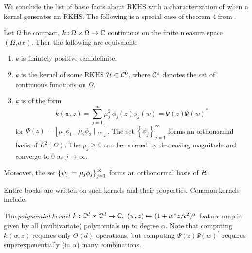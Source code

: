 We conclude the list of basic facts about RKHS with a characterization of 
when a kernel generates an RKHS. The following is a special case of theorem 
$4$ from \cite{RKHS_probability}. 

\begin{theorem}
    \label{thm:RKHS}
    Let $\Omega$ be compact, $k : \Omega \times \Omega \to \mathbb{C}$ continuous on the 
    finite measure space $(\Omega, dx)$. Then the following are equivalent: 
    \begin{enumerate}
        \item $k$ is finintely positive semidefinite. 
        \item $k$ is the kernel of some RKHS $\mathcal{H} \subset \mathcal{C}^0$, where $\mathcal{C}^0$ 
            denotes the set of continuous functions on $\Omega$. 
        \item $k$ is of the form 
            \begin{equation}
                k(w, z) 
                = \sum_{j=1}^{\infty} \mu_j^2\, \phi_j (z) \overline{\phi_j (w)}
                = \Psi (z) \Psi (w)^*
            \end{equation}
            for $\Psi (z) = \left[ \mu_1 \phi_1 \mid \mu_2 \phi_2 \mid \ldots \right]$. 
            The set $\left\{ \phi_j \right\}_{j=1}^\infty$ forms an orthonormal 
            basis of $L^2 (\Omega)$. 
            The $\mu_j \geq 0$ can be ordered by decreasing magnitude and 
            converge to $0$ as $j \to \infty$. 
    \end{enumerate}
    Moreover, the set $\left\{ \psi_j \defeq \mu_j \phi_j \right\}_{j=1}^\infty$
    forms an orthonormal basis of $\mathcal{H}$. 
\end{theorem}

Entire books are written on such kernels \cite{RKHS} and their properties. Common 
kernels include:

\begin{example}
    The \emph{polynomial kernel} 
    $k : \mathbb{C}^d \times \mathbb{C}^d \to \mathbb{C},\ (w, z) \mapsto (1 + w^* z / c^2)^\alpha$ 
    feature map is given by all (multivariate) polynomials up to degree $\alpha$. Note 
    that computing $k(w, z)$ requires only $O(d)$ operations, but computing 
    $\Psi (z) \Psi (w)^*$ requires superexponentially (in $\alpha$) many combinations. 
\end{example}


